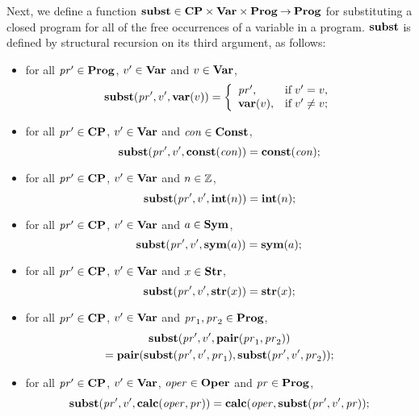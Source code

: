 Next, we define a function
%
%
$\mathbf{subst}\in\mathbf{CP}\times\mathbf{Var}\times\mathbf{Prog}\mathbin{\to}\mathbf{Prog}$ for substituting a
closed program for all of the free occurrences of a variable in a
program.  $\mathbf{subst}$ is defined by structural recursion on its third
argument, as follows:
\begin{itemize}
\item for all $\mathit{pr}'\in\mathbf{Prog}$, $v'\in\mathbf{Var}$ and $v\in\mathbf{Var}$,
\begin{displaymath}
\subst(\pr',v',\progvar(v)) =
\casesdef{\pr',}{\eqtxtr{if} v'=v ,}%
{\progvar(v),}{\eqtxtr{if} v'\neq v ;}
\end{displaymath}

\item for all $\mathit{pr}'\in\mathbf{CP}$, $v'\in\mathbf{Var}$ and $\mathit{con}\in\mathbf{Const}$,
  \begin{displaymath}
    \mathbf{subst}(\mathit{pr}',v',\mathbf{const}(\mathit{con})) = \mathbf{const}(\mathit{con}) ;
  \end{displaymath}

\item for all $\mathit{pr}'\in\mathbf{CP}$, $v'\in\mathbf{Var}$ and $n\in\mathbb{Z}$,
  \begin{displaymath}
    \mathbf{subst}(\mathit{pr}',v',\mathbf{int}(n)) = \mathbf{int}(n) ;
  \end{displaymath}

\item for all $\mathit{pr}'\in\mathbf{CP}$, $v'\in\mathbf{Var}$ and $a\in\mathbf{Sym}$,
  \begin{displaymath}
    \mathbf{subst}(\mathit{pr}',v',\mathbf{sym}(a)) = \mathbf{sym}(a) ;
  \end{displaymath}

\item for all $\mathit{pr}'\in\mathbf{CP}$, $v'\in\mathbf{Var}$ and $x\in\mathbf{Str}$,
  \begin{displaymath}
    \mathbf{subst}(\mathit{pr}',v',\mathbf{str}(x)) = \mathbf{str}(x) ;
  \end{displaymath}

\item for all $\mathit{pr}'\in\mathbf{CP}$, $v'\in\mathbf{Var}$ and $\mathit{pr}_1,\mathit{pr}_2\in\mathbf{Prog}$,
  \begin{multline*}
    \mathbf{subst}(\mathit{pr}',v',\mathbf{pair}(\mathit{pr}_1,\mathit{pr}_2)) \\
    = \mathbf{pair}(\mathbf{subst}(\mathit{pr}',v',\mathit{pr}_1),\mathbf{subst}(\mathit{pr}',v',\mathit{pr}_2)) ;
  \end{multline*}

\item for all $\mathit{pr}'\in\mathbf{CP}$, $v'\in\mathbf{Var}$, $\mathit{oper}\in\mathbf{Oper}$ and
  $\mathit{pr}\in\mathbf{Prog}$,
  \begin{displaymath}
    \mathbf{subst}(\mathit{pr}',v',\mathbf{calc}(\mathit{oper}, \mathit{pr})) =
    \mathbf{calc}(\mathit{oper},\mathbf{subst}(\mathit{pr}',v',\mathit{pr})) ;
  \end{displaymath}


\end{itemize}
